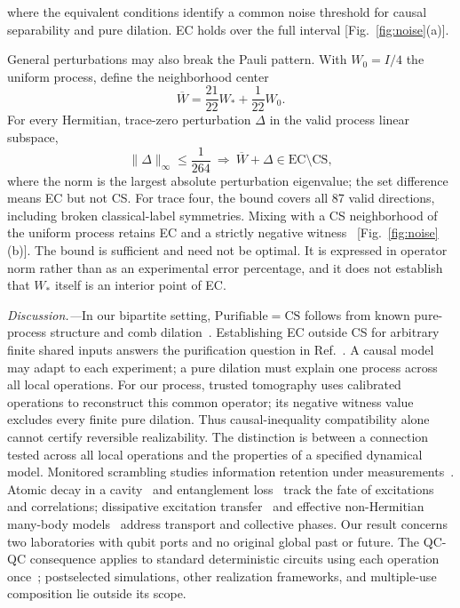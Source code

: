 \documentclass[aps,prl,reprint,superscriptaddress,longbibliography,bibnotes,floatfix]{revtex4-2}
\newcommand{\EC}{\mathrm{EC}}
\newcommand{\CS}{\mathrm{CS}}
\begin{document}
where the equivalent conditions identify a common noise threshold for causal separability and pure dilation. EC holds over the full interval [Fig.~\ref{fig:noise}(a)].

General perturbations may also break the Pauli pattern. With $W_0=I/4$ the uniform process, define the neighborhood center
\begin{equation}
 \overline W=\frac{21}{22}W_*+\frac1{22}W_0.
 \label{eq:robust-center}
\end{equation}
For every Hermitian, trace-zero perturbation $\Delta$ in the valid process linear subspace,
\begin{equation}
 \|\Delta\|_\infty\le\frac1{264}
 \ \Longrightarrow\ 
 \overline W+\Delta\in\EC\setminus\CS,
 \label{eq:robust-ball}
\end{equation}
where the norm is the largest absolute perturbation eigenvalue; the set difference means EC but not CS. For trace four, the bound covers all 87 valid directions, including broken classical-label symmetries. Mixing with a CS neighborhood of the uniform process retains EC and a strictly negative witness~\cite{SM} [Fig.~\ref{fig:noise}(b)]. The bound is sufficient and need not be optimal. It is expressed in operator norm rather than as an experimental error percentage, and it does not establish that $W_*$ itself is an interior point of EC.

\emph{Discussion.---}In our bipartite setting, $\mathrm{Purifiable}=\CS$ follows from known pure-process structure and comb dilation~\cite{Yokojima,Cyclic,QuantumNetworks,purif}. Establishing EC outside CS for arbitrary finite shared inputs answers the purification question in Ref.~\cite{purif}. A causal model may adapt to each experiment; a pure dilation must explain one process across all local operations. For our process, trusted tomography uses calibrated operations to reconstruct this common operator; its negative witness value excludes every finite pure dilation. Thus causal-inequality compatibility alone cannot certify reversible realizability. The distinction is between a connection tested across all local operations and the properties of a specified dynamical model. Monitored scrambling studies information retention under measurements~\cite{QiMonitoredQEC}. Atomic decay in a cavity~\cite{GarrawayPseudomode} and entanglement loss~\cite{YuSuddenDeath} track the fate of excitations and correlations; dissipative excitation transfer~\cite{PuOpenSystem} and effective non-Hermitian many-body models~\cite{Li2024NonHermitian} address transport and collective phases. Our result concerns two laboratories with qubit ports and no original global past or future. The QC-QC consequence applies to standard deterministic circuits using each operation once~\cite{QCQC}; postselected simulations, other realization frameworks, and multiple-use composition lie outside its scope.
\end{document}
